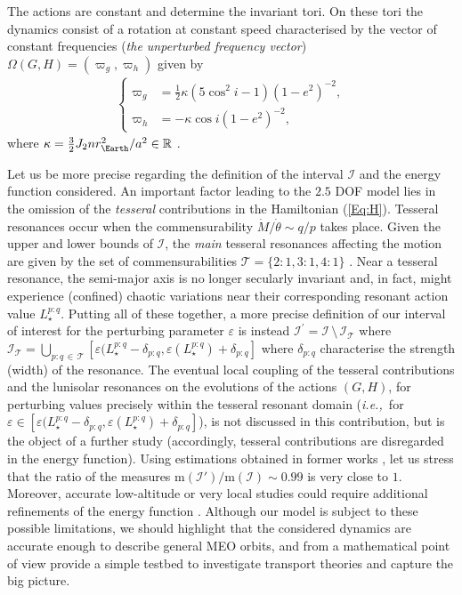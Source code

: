 \documentclass{amsart}
\theoremstyle{definition}
\theoremstyle{remark}
\numberwithin{equation}{section}
\newcommand{\ie}{\textit{i.e.,\ }}
\newcommand{\eg}{\textit{e.g.,\ }}
\begin{document}
The actions are constant and determine the invariant tori. On these tori the dynamics consist of a rotation at constant speed characterised by the vector of constant frequencies (\textit{the unperturbed frequency vector}) $   \Omega(G,H)=(\varpi_{g},\varpi_{h})$ given by 
\begin{align}
\left\{
	\begin{aligned}
	\varpi_{g} & = \frac{1}{2} \kappa (5 \cos^{2}i-1) (1-e^{2})^{-2},\\
	\varpi_{h} & = - \kappa \cos i (1-e^{2})^{-2},
	\end{aligned}
\right.
\end{align} 
where $\kappa = \frac{3}{2} J_{2} n r_{\Earth}^{2}/a^{2} \in \mathbb{R}$ \citep{wKa66}. 
{\color{black} 

Let us be more precise regarding the definition of the interval $\mathcal{I}$ and the energy function considered. An important factor leading to the $2.5$ DOF model lies in the omission of the \textit{tesseral} contributions in the Hamiltonian (\ref{Eq:H}).  
Tesseral resonances occur when the commensurability 
$\dot{M}/\dot{\theta} \sim q/p$ takes place. 
Given the upper and lower bounds of $\mathcal{I}$, the  \textit{main} tesseral resonances affecting the motion
are given by the set of commensurabilities $\mathcal{T}=\{
2:1, 3:1, 4:1\}$ \citep[see \eg][]{tEl96,aCe15minor}.   
Near a tesseral resonance, the semi-major axis is no longer 
secularly invariant and, in fact, might experience (confined) chaotic variations near their corresponding resonant action value $L_{\star}^{p:q}$. 
Putting all of these together, a more precise definition of our interval of interest for the perturbing parameter $\varepsilon$ is  instead 
$\mathcal{I}^{'}=\mathcal{I} \, \setminus \, \mathcal{I}_{\mathcal{T}}$ where
$\mathcal{I}_{\mathcal{T}} = \bigcup_{p:q \,\in \, \mathcal{T}} [\varepsilon(L_{\star}^{p:q} - \delta_{p:q},\varepsilon(L_{\star}^{p:q}) + \delta_{p:q}]$ where $\delta_{p:q}$ characterise the strength (width) of the resonance. The eventual local coupling of the tesseral contributions  and the lunisolar resonances on the evolutions of the actions $(G,H)$, for perturbing values precisely within the tesseral resonant domain (\ie for $\varepsilon \in [\varepsilon(L_{\star}^{p:q} - \delta_{p:q},\varepsilon(L_{\star}^{p:q}) + \delta_{p:q}]$), is not discussed in this contribution, but is the object of a further study (accordingly, tesseral contributions are disregarded in the energy function). 
Using estimations obtained in former works \citep{tEl96,aCe15minor}, let us stress that the ratio of the measures 
$\textrm{m}(\mathcal{I'})/\textrm{m}(\mathcal{I}) \sim 0.99$  is very close to $1$. 
Moreover, accurate low-altitude or very local studies could require additional refinements of the energy function \citep[\eg near the critical inclination, see][]{mLa18}. 
Although our model is subject to these possible limitations, we should highlight that the considered dynamics are accurate enough to describe general MEO orbits, and from a mathematical point of view provide a simple testbed to investigate transport theories and capture the big picture.}
\end{document}
